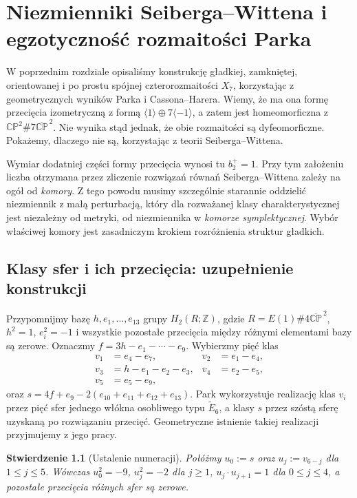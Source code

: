 \documentclass[11pt,a4paper]{report}
\numberwithin{equation}{section}
\theoremstyle{plain}
\newtheorem{stwierdzenie}[twierdzenie]{Stwierdzenie}
\theoremstyle{definition}
\theoremstyle{remark}
\begin{document}
\chapter{Niezmienniki Seiberga--Wittena i egzotyczność rozmaitości Parka}
\label{ch:tg-park-sw}

W poprzednim rozdziale opisaliśmy konstrukcję gładkiej,
zamkniętej, orientowanej i po prostu spójnej
czterorozmaitości $X_7$, korzystając z geometrycznych
wyników Parka i Cassona--Harera.
Wiemy, że ma ona formę przecięcia izometryczną z formą
$\langle1\rangle\oplus7\langle-1\rangle$, a zatem jest
homeomorficzna z $\mathbb{CP}^2\#7\overline{\mathbb{CP}}^{\,2}$.
Nie wynika stąd jednak, że obie rozmaitości są dyfeomorficzne.
Pokażemy, dlaczego nie są, korzystając z teorii Seiberga--Wittena.

Wymiar dodatniej części formy przecięcia wynosi tu $b_2^+=1$.
Przy tym założeniu liczba otrzymana przez zliczenie rozwiązań
równań Seiberga--Wittena zależy na ogół od \emph{komory}.
Z tego powodu musimy szczególnie starannie oddzielić niezmiennik
z małą perturbacją, który dla rozważanej klasy charakterystycznej
jest niezależny od metryki, od niezmiennika w \emph{komorze
symplektycznej}. Wybór właściwej komory jest zasadniczym krokiem
rozróżnienia struktur gładkich.

\section{Klasy sfer i ich przecięcia: uzupełnienie konstrukcji}
\label{sec:tg-park14-spheres}

Przypomnijmy bazę $h,e_1,\ldots,e_{13}$ grupy
$H_2(R;\mathbb Z)$, gdzie $R=E(1)\#4\overline{\mathbb{CP}}^{\,2}$,
$h^2=1$, $e_i^2=-1$ i wszystkie pozostałe przecięcia między
różnymi elementami bazy są zerowe. Oznaczmy
$f=3h-e_1-\cdots-e_9$. Wybierzmy pięć klas
\[
\begin{aligned}
 v_1&=e_4-e_7, & v_2&=e_1-e_4, \\
 v_3&=h-e_1-e_2-e_3, & v_4&=e_2-e_5, \\
 v_5&=e_5-e_9,
\end{aligned}
\]
oraz $s=4f+e_9-2(e_{10}+e_{11}+e_{12}+e_{13})$.
Park wykorzystuje realizację klas $v_i$ przez pięć sfer
jednego włókna osobliwego typu $\widetilde E_6$, a klasy $s$
przez szóstą sferę uzyskaną po rozwiązaniu przecięć.
Geometryczne istnienie takiej realizacji przyjmujemy z jego pracy.

\begin{stwierdzenie}[Ustalenie numeracji]
\label{prop:tg-park14-classes}
Połóżmy $u_0:=s$ oraz $u_j:=v_{6-j}$ dla $1\le j\le5$.
Wówczas $u_0^2=-9$, $u_j^2=-2$ dla $j\ge1$,
$u_j\cdot u_{j+1}=1$ dla $0\le j\le4$, a pozostałe
przecięcia różnych sfer są zerowe.
\end{stwierdzenie}
\end{document}
